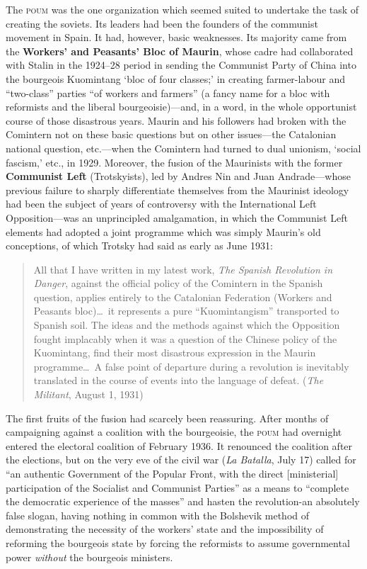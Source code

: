 The \textsc{poum} was the one organization which seemed suited to undertake the task of creating the soviets. Its leaders had been the founders of the communist movement in Spain. It had, however, basic weaknesses. Its majority came from the \textbf{Workers’ and Peasants’ Bloc of Maurin}, whose cadre had collaborated with Stalin in the 1924–28 period in sending the Communist Party of China into the bourgeois Kuomintang `bloc of four classes;' in creating farmer-labour and ``two-class'' parties ``of workers and farmers'' (a fancy name for a bloc with reformists and the liberal bourgeoisie)---and, in a word, in the whole opportunist course of those disastrous years. Maurin and his followers had broken with the Comintern not on these basic questions but on other issues---the Catalonian national question, etc.---when the Comintern had turned to dual unionism, ‘social fascism,’ etc., in 1929. Moreover, the fusion of the Maurinists with the former \textbf{Communist Left} (Trotskyists), led by Andres Nin and Juan Andrade---whose previous failure to sharply differentiate themselves from the Maurinist ideology had been the subject of years of controversy with the International Left Opposition---was an unprincipled amalgamation, in which the Communist Left elements had adopted a joint programme which was simply Maurin’s old conceptions, of which Trotsky had said as early as June 1931:
\begin{quote}
  All that I have written in my latest work, \emph{The Spanish Revolution in Danger}, against the official policy of the Comintern in the Spanish question, applies entirely to the Catalonian Federation (Workers and Peasants bloc)\ldots\ it represents a pure ``Kuomintangism'' transported to Spanish soil. The ideas and the methods against which the Opposition fought implacably when it was a question of the Chinese policy of the Kuomintang, find their most disastrous expression in the Maurin programme\ldots\ A false point of departure during a revolution is inevitably translated in the course of events into the language of defeat. (\emph{The Militant}, August 1, 1931)
\end{quote}

The first fruits of the fusion had scarcely been reassuring. After months of campaigning against a coalition with the bourgeoisie, the \textsc{poum} had overnight entered the electoral coalition of February 1936. It renounced the coalition after the elections, but on the very eve of the civil war (\emph{La Batalla}, July 17) called for ``an authentic Government of the Popular Front, with the direct [ministerial] participation of the Socialist and Communist Parties'' as a means to ``complete the democratic experience of the masses'' and hasten the revolution-an absolutely false slogan, having nothing in common with the Bolshevik method of demonstrating the necessity of the workers’ state and the impossibility of reforming the bourgeois state by forcing the reformists to assume governmental power \emph{without} the bourgeois ministers.

